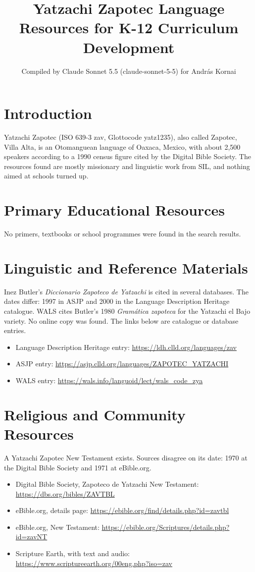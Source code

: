 \documentclass[12pt]{article}
\title{Yatzachi Zapotec Language Resources for K-12 Curriculum Development}
\author{Compiled by Claude Sonnet 5.5 (claude-sonnet-5-5) for Andr\'as Kornai}
\date{}
\begin{document}
\maketitle

\section{Introduction}
Yatzachi Zapotec (ISO 639-3 zav, Glottocode yatz1235), also called Zapotec, Villa Alta, is an Otomanguean language of Oaxaca, Mexico, with about 2,500 speakers according to a 1990 census figure cited by the Digital Bible Society. The resources found are mostly missionary and linguistic work from SIL, and nothing aimed at schools turned up.

\section{Primary Educational Resources}
No primers, textbooks or school programmes were found in the search results.

\section{Linguistic and Reference Materials}
Inez Butler's \emph{Diccionario Zapoteco de Yatzachi} is cited in several databases. The dates differ: 1997 in ASJP and 2000 in the Language Description Heritage catalogue. WALS cites Butler's 1980 \emph{Gram\'atica zapoteca} for the Yatzachi el Bajo variety. No online copy was found. The links below are catalogue or database entries.
\begin{itemize}
\item Language Description Heritage entry: \url{https://ldh.clld.org/languages/zav}
\item ASJP entry: \url{https://asjp.clld.org/languages/ZAPOTEC_YATZACHI}
\item WALS entry: \url{https://wals.info/languoid/lect/wals_code_zya}
\end{itemize}

\section{Religious and Community Resources}
A Yatzachi Zapotec New Testament exists. Sources disagree on its date: 1970 at the Digital Bible Society and 1971 at eBible.org.
\begin{itemize}
\item Digital Bible Society, Zapoteco de Yatzachi New Testament: \url{https://dbs.org/bibles/ZAVTBL}
\item eBible.org, details page: \url{https://ebible.org/find/details.php?id=zavtbl}
\item eBible.org, New Testament: \url{https://ebible.org/Scriptures/details.php?id=zavNT}
\item Scripture Earth, with text and audio: \url{https://www.scriptureearth.org/00eng.php?iso=zav}
\end{itemize}
\end{document}
